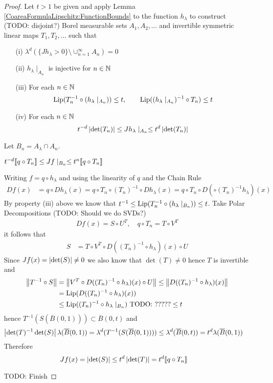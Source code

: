 \begin{proof}
Let $t>1$ be given and apply Lemma \ref{CoareaFormulaLipschitz:FunctionBounds} to the function $h_\lambda$ to construct (TODO: disjoint?) Borel measurable sets $A_1, A_2, \dotsc$ and invertible symmetric
linear maps $T_1, T_2, \dotsc$ such that
\begin{itemize}
\item[(i)] $\lambda^d(\lbrace Jh_\lambda>0\rbrace \setminus \cup_{n=1}^\infty A_n) = 0$
\item[(ii)] $h_\lambda \mid_{A_n}$ is injective for $n \in \mathbb{N}$
\item[(iii)] For each $n \in \mathbb{N}$
\begin{align}
\operatorname*{Lip}( T_n^{-1} \circ (h_\lambda \mid_{A_n})) \leq t, \qquad \operatorname*{Lip}((h_\lambda  \mid_{A_n})^{-1} \circ T_n) \leq t
\end{align}
\item[(iv)] For each $n \in \mathbb{N}$
\begin{align}
t^{-d} \left \vert \det(T_n) \right \vert \leq Jh_\lambda\mid_{A_n} \leq t^{d} \left \vert \det(T_n) \right \vert 
\end{align}
\end{itemize}
Let $B_n = A_\lambda \cap A_n$.
\begin{clm} $t^{-d} \llbracket q \circ T_n \rrbracket \leq Jf \mid_{B_n} \leq t^n \llbracket  q \circ T_n  \rrbracket$
\end{clm}
Writing $f = q \circ h_\lambda$ and using the linearity of $q$ and the Chain Rule
\begin{align*}
Df(x) &= q \circ Dh_\lambda(x) = q \circ T_n \circ (T_n)^{-1} \circ Dh_\lambda(x) = q \circ T_n \circ D(\circ (T_n)^{-1} h_\lambda)(x)
\end{align*}
By property (iii) above we know that $t^{-1} \leq \operatorname*{Lip}( T_n^{-1} \circ (h_\lambda \mid_{B_n})) \leq t$.  Take Polar Decompositions (TODO: Should we do SVDs?)
\begin{align*}
Df(x) = S \circ U^T, \quad q \circ T_n = T \circ V^T
\end{align*}
it follows that 
\begin{align*}
S &= T \circ V^T \circ D((T_n)^{-1} \circ h_\lambda)(x) \circ U
\end{align*}
Since $Jf(x) = \left \vert \det(S) \right \vert \neq 0$ we also know that $\det(T) \neq 0$ hence $T$ is invertible and
\begin{align*}
\left \lVert T^{-1} \circ S \right \rVert &= \left \lVert V^T \circ D( (T_n)^{-1} \circ h_\lambda)(x) \circ U \right \rVert
\leq \left \lVert D((T_n)^{-1} \circ h_\lambda)(x) \right \rVert \\
&= \operatorname*{Lip}(D((T_n)^{-1} \circ h_\lambda)(x)) \\
&\leq \operatorname*{Lip}((T_n)^{-1} \circ  h_\lambda\mid_{B_n}) \text{ TODO: ?????}
\leq t
\end{align*}
hence $T^{-1}(S(\overline{B}(0,1))) \subset \overline{B}(0,t)$ and 
\begin{align*}
\left \vert \det(T)^{-1} \det(S)  \right \vert \lambda(\overline{B}(0,1)) &= \lambda^d(T^{-1}(S(\overline{B}(0,1)))) \leq \lambda^d(\overline{B}(0,t)) = t^d \lambda(\overline{B}(0,1)) 
\end{align*}
Therefore
\begin{align*}
Jf(x) &= \left \vert \det(S) \right \vert \leq t^d \left \vert \det(T) \right \vert = t^d \llbracket q \circ T_n \rrbracket
\end{align*}

TODO: Finish
\end{proof}
